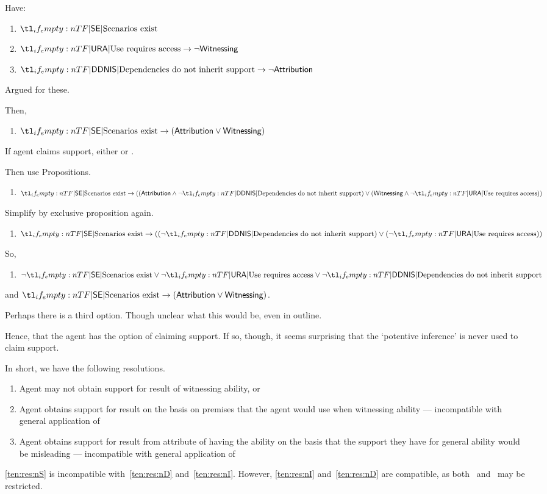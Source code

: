 \begin{note}
  Have:
  \begin{enumerate}
  \item \(\eA{}\)
  \item \(\uRa{} \rightarrow \lnot\WR{}\)
  \item \(\nI{} \rightarrow \lnot\AR{}\)
  \end{enumerate}
  Argued for these.

  Then,
  \begin{enumerate}
  \item \(\eA{} \rightarrow (\AR{} \lor \WR{})\)
  \end{enumerate}
  If agent claims support, either \AR{} or \WR{}.

  Then use Propositions.
  \begin{enumerate}
  \item \(\eA{} \rightarrow ((\AR{} \land \lnot\nI{}) \lor (\WR{} \land \lnot\uRa{}))\)
  \end{enumerate}
  Simplify by exclusive proposition again.
    \begin{enumerate}
  \item \(\eA{} \rightarrow ((\lnot\nI{}) \lor (\lnot\uRa{}))\)
  \end{enumerate}

  So,
  \begin{enumerate}
  \item \(\lnot\eA{} \lor \lnot\uRa{} \lor \lnot\nI{}\)
  \end{enumerate}
\end{note}

\begin{note}
  \eA{} and \(\eA{} \rightarrow (\AR{} \lor \WR{})\).

  Perhaps there is a third option.
  Though unclear what this would be, even in outline.

  Hence, that the agent has the option of claiming support.
  If so, though, it seems surprising that the `potentive inference' is never used to claim support.
\end{note}

\begin{note}
  In short, we have the following resolutions.
  \begin{enumerate}
  \item\label{ten:res:nS} Agent may not obtain support for result of witnessing ability, or
  \item\label{ten:res:nD} Agent obtains support for result on the basis on premises that the agent would use when witnessing ability --- incompatible with general application of~\uRa{}
  \item\label{ten:res:nI} Agent obtains support for result from attribute of having the ability on the basis that the support they have for general ability would be misleading --- incompatible with general application of~\nI{}
  \end{enumerate}
  \ref{ten:res:nS} is incompatible with~\ref{ten:res:nD} and~\ref{ten:res:nI}.
  However, \ref{ten:res:nI} and~\ref{ten:res:nD} are compatible, as both~\uRa{} and~\nI{} may be restricted.
\end{note}


